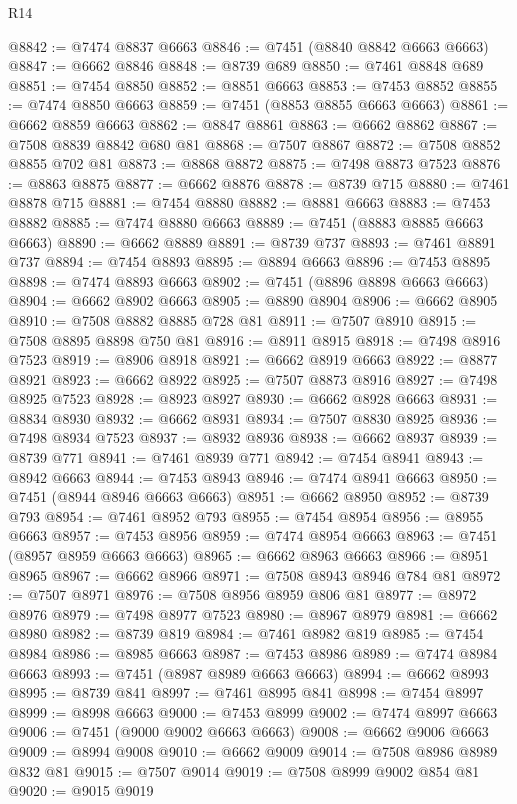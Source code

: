 \begin{lexlean}{R14}
\begin{coremodule}
{{{{{{{{{{{{{{{{{{{{{{{{{{{{{{{{{{{{{{{{{{{{{{{{{{{{{{{{{{{{{{{{{{{{{{{{{{{{{{{{{{@8842 := @7474 @8837 @6663
@8846 := @7451 (@8840 @8842 @6663 @6663)
@8847 := @6662 @8846
@8848 := @8739 @689
@8850 := @7461 @8848 @689
@8851 := @7454 @8850
@8852 := @8851 @6663
@8853 := @7453 @8852
@8855 := @7474 @8850 @6663
@8859 := @7451 (@8853 @8855 @6663 @6663)
@8861 := @6662 @8859 @6663
@8862 := @8847 @8861
@8863 := @6662 @8862
@8867 := @7508 @8839 @8842 @680 @81
@8868 := @7507 @8867
@8872 := @7508 @8852 @8855 @702 @81
@8873 := @8868 @8872
@8875 := @7498 @8873 @7523
@8876 := @8863 @8875
@8877 := @6662 @8876
@8878 := @8739 @715
@8880 := @7461 @8878 @715
@8881 := @7454 @8880
@8882 := @8881 @6663
@8883 := @7453 @8882
@8885 := @7474 @8880 @6663
@8889 := @7451 (@8883 @8885 @6663 @6663)
@8890 := @6662 @8889
@8891 := @8739 @737
@8893 := @7461 @8891 @737
@8894 := @7454 @8893
@8895 := @8894 @6663
@8896 := @7453 @8895
@8898 := @7474 @8893 @6663
@8902 := @7451 (@8896 @8898 @6663 @6663)
@8904 := @6662 @8902 @6663
@8905 := @8890 @8904
@8906 := @6662 @8905
@8910 := @7508 @8882 @8885 @728 @81
@8911 := @7507 @8910
@8915 := @7508 @8895 @8898 @750 @81
@8916 := @8911 @8915
@8918 := @7498 @8916 @7523
@8919 := @8906 @8918
@8921 := @6662 @8919 @6663
@8922 := @8877 @8921
@8923 := @6662 @8922
@8925 := @7507 @8873 @8916
@8927 := @7498 @8925 @7523
@8928 := @8923 @8927
@8930 := @6662 @8928 @6663
@8931 := @8834 @8930
@8932 := @6662 @8931
@8934 := @7507 @8830 @8925
@8936 := @7498 @8934 @7523
@8937 := @8932 @8936
@8938 := @6662 @8937
@8939 := @8739 @771
@8941 := @7461 @8939 @771
@8942 := @7454 @8941
@8943 := @8942 @6663
@8944 := @7453 @8943
@8946 := @7474 @8941 @6663
@8950 := @7451 (@8944 @8946 @6663 @6663)
@8951 := @6662 @8950
@8952 := @8739 @793
@8954 := @7461 @8952 @793
@8955 := @7454 @8954
@8956 := @8955 @6663
@8957 := @7453 @8956
@8959 := @7474 @8954 @6663
@8963 := @7451 (@8957 @8959 @6663 @6663)
@8965 := @6662 @8963 @6663
@8966 := @8951 @8965
@8967 := @6662 @8966
@8971 := @7508 @8943 @8946 @784 @81
@8972 := @7507 @8971
@8976 := @7508 @8956 @8959 @806 @81
@8977 := @8972 @8976
@8979 := @7498 @8977 @7523
@8980 := @8967 @8979
@8981 := @6662 @8980
@8982 := @8739 @819
@8984 := @7461 @8982 @819
@8985 := @7454 @8984
@8986 := @8985 @6663
@8987 := @7453 @8986
@8989 := @7474 @8984 @6663
@8993 := @7451 (@8987 @8989 @6663 @6663)
@8994 := @6662 @8993
@8995 := @8739 @841
@8997 := @7461 @8995 @841
@8998 := @7454 @8997
@8999 := @8998 @6663
@9000 := @7453 @8999
@9002 := @7474 @8997 @6663
@9006 := @7451 (@9000 @9002 @6663 @6663)
@9008 := @6662 @9006 @6663
@9009 := @8994 @9008
@9010 := @6662 @9009
@9014 := @7508 @8986 @8989 @832 @81
@9015 := @7507 @9014
@9019 := @7508 @8999 @9002 @854 @81
@9020 := @9015 @9019
}}}}}}}}}}}}}}}}}}}}}}}}}}}}}}}}}}}}}}}}}}}}}}}}}}}}}}}}}}}}}}}}}}}}}}}}}}}}}}}}}}
\end{coremodule}
\end{lexlean}
